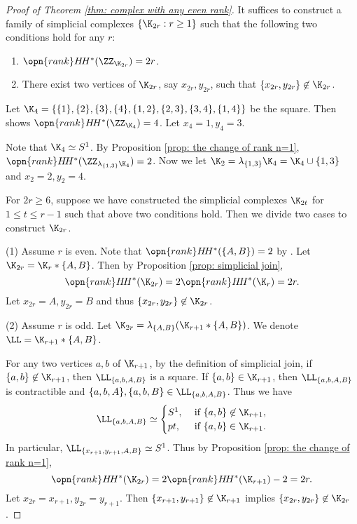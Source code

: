 \begin{proof}[Proof of Theorem \ref{thm: complex with any even rank}]
    It suffices to construct a family of simplicial complexes
$\{\K_{2r}:r\ge 1\}$ such that the following two conditions hold for any
$r$:
\begin{enumerate}
    \item 
    $\opn{rank} H\!H^*(\ZZ_{\K_{2r}})=2r$.
    \item 
    There  exist two vertices of $\K_{2r}$, say $x_{2r},y_{2r}$, such
    that $\{x_{2r},y_{2r}\}\not\in \K_{2r}$.
\end{enumerate}

Let $\K_4=\{\{1\},\{2\},\{3\},\{4\},\{1,2\},\{2,3\},\{3,4\},\{1,4\}\}$ be the square. Then \cite[Example 6.4]{LPSS-2023} shows
$\opn{rank} H\!H^*(\ZZ_{\K_4})=4$. Let $x_4=1,y_4=3$.

Note that $\K_4\simeq S^1$. By Proposition \ref{prop: the change of rank n=1}, $\opn{rank} H\!H^*(\ZZ_{\lambda_{\{1,3\}}\K_4})=2$. Now
we let $\K_2=\lambda_{\{1,3\}}\K_4=\K_4\cup \{1,3\}$ and
$x_2=2,y_2=4$.

For $2r\ge 6$, suppose we have constructed the simplicial complexes $\K_{2t}$
for $1\le t\le r-1$ such that above two conditions hold.
Then we divide two cases to construct $\K_{2r}$.

(1) Assume $r$ is even. Note that $\opn{rank} H\!H^*(\{A,B\})=2$
by \cite[Theorem 6.5]{LPSS-2023}.
Let $\K_{2r}=\K_r*\{A,B\}$. Then by Proposition \ref{prop: simplicial join}, 
$$\opn{rank} H\!H^*(\K_{2r})=2\opn{rank} H\!H^*(\K_r)=2r.$$
Let $x_{2r}=A,y_{2r}=B$ and thus $\{x_{2r},y_{2r}\}\not\in \K_{2r}$.

(2) Assume $r$ is odd.
Let $\K_{2r}=\lambda_{\{A,B\}}(\K_{r+1}*\{A,B\})$.
We denote $\LL=\K_{r+1}*\{A,B\}$. 

For any two vertices $a,b$ of $\K_{r+1}$,
by the definition
of simplicial join, if $\{a,b\}\not\in \K_{r+1}$, then $\LL_{\{a,b,A,B\}}$
is a square. If $\{a,b\}\in \K_{r+1}$, then $\LL_{\{a,b,A,B\}}$
is contractible and $\{a,b,A\},\{a,b,B\}\in \LL_{\{a,b,A,B\}}$.
Thus we have
\begin{equation*}
    \begin{split}
        \LL_{\{a,b,A,B\}}\simeq
        \begin{cases}
            S^1, & \text{ if } \{a,b\}\not\in \K_{r+1},\\
            pt, & \text{ if } \{a,b\}\in \K_{r+1}.
        \end{cases}
    \end{split}
\end{equation*}
In particular, $\LL_{\{x_{r+1},y_{r+1},A,B\}}\simeq S^1$. Thus
by Proposition \ref{prop: the change of rank n=1},
$$\opn{rank} H\!H^*(\K_{2r})=2\opn{rank} H\!H^*(\K_{r+1})-2=2r.$$
Let $x_{2r}=x_{r+1},y_{2r}=y_{r+1}$. Then 
$\{x_{r+1},y_{r+1}\}\not\in \K_{r+1}$ implies
$\{x_{2r},y_{2r}\}\not\in \K_{2r}$.


\end{proof}











